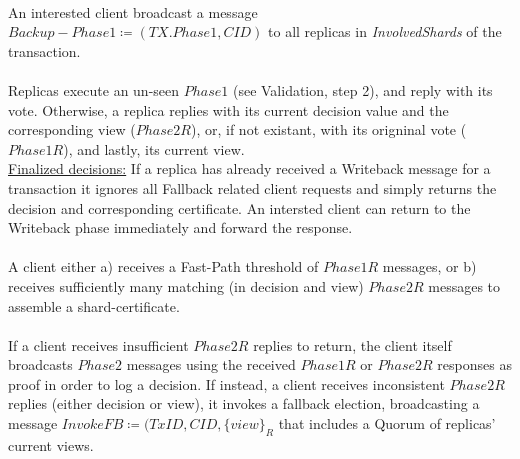 \\
An interested client broadcast a message $Backup-Phase1 \coloneqq (TX.Phase1, CID)$ to all replicas in \textit{InvolvedShards} of the transaction. \\
\\
Replicas execute an un-seen $Phase1$ (see Validation, step 2), and reply with its vote. Otherwise, a replica replies with its current decision value and the corresponding view ($Phase2R$), or, if not existant, with its origninal vote ($Phase1R$), and lastly, its current view.\\
\underline{Finalized decisions:} If a replica has already received a Writeback message for a transaction it ignores all Fallback related client requests and simply returns the decision and corresponding certificate. An intersted client can return to the Writeback phase immediately and forward the response.\\
\\
A client either a) receives a Fast-Path threshold of $Phase1R$ messages, or b) receives sufficiently many matching (in decision and view) $Phase2R$ messages to assemble a shard-certificate. \\
\\
If a client receives insufficient $Phase2R$ replies to return, the client itself broadcasts $Phase2$ messages using the received $Phase1R$ or $Phase2R$ responses as proof in order to log a decision. If instead, a client receives inconsistent $Phase2R$ replies (either decision or view), it invokes a fallback election, broadcasting a message $InvokeFB \coloneqq (TxID, CID, \{view\}_R$ that includes a Quorum of replicas' current views.
